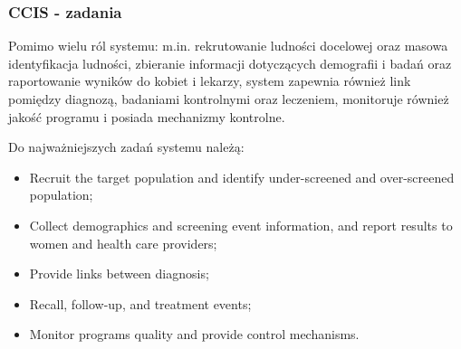 \begin{frame}
\frametitle{CCIS - zadania}

Pomimo wielu ról systemu: m.in. rekrutowanie ludności docelowej oraz masowa identyfikacja ludności, zbieranie informacji dotyczących demografii i badań oraz raportowanie wyników do kobiet i lekarzy, system zapewnia również link pomiędzy diagnozą, badaniami kontrolnymi oraz leczeniem, monitoruje również jakość programu i posiada mechanizmy kontrolne.

Do najważniejszych zadań systemu należą:
  \begin{itemize}
  \item Recruit the target population and identify under-screened and over-screened population;
  \item Collect demographics and screening event information, and report results to women and health care providers;
  \item Provide links between diagnosis;
  \item Recall, follow-up, and treatment events;
  \item Monitor programs quality and provide control mechanisms.
  \end{itemize}
\end{frame}




